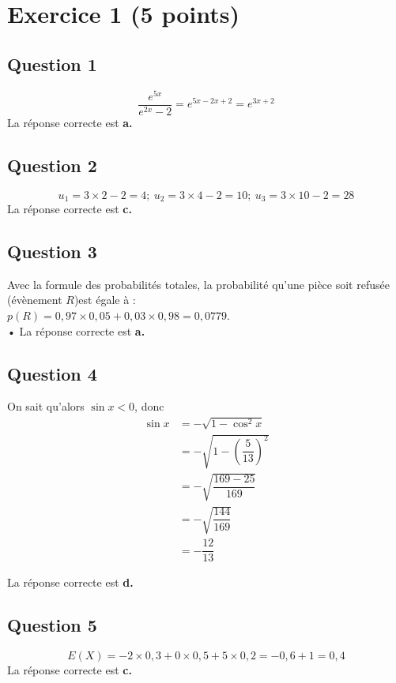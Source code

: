 \section*{Exercice 1 (5 points)}
	

	\subsection*{Question 1}

	
	\[
	\dfrac{e^{5x}}{e^{2x}-2} = e^{5x-2x+2} = e^{3x+2}
	\]
La réponse correcte est \textbf{a.}
	
	\subsection*{Question 2}
	

	
	\[
	u_1 = 3 \times 2 - 2 = 4 ; \ u_2 = 3 \times 4 - 2 = 10 ; \ u_3 = 3 \times 10 - 2 = 28
	\]
La réponse correcte est \textbf{c.}
	
	\subsection*{Question 3}
	
Avec la formule des probabilités totales, la probabilité qu’une pièce soit refusée (évènement $R$)est égale à :\\
 $p(R)=0,97 \times 0,05 + 0,03 \times 0,98 = 0,0779$.\\•
 La réponse correcte est \textbf{a.}
	
	\subsection*{Question 4}
	
On sait qu’alors $\sin x < 0$, donc 
\begin{align*}
	\sin x &= -\sqrt{1 - \cos^2 x}\\
	& = -\sqrt{1 - \left(\dfrac{5}{13}\right)^2}\\
	& = -\sqrt{\dfrac{169 - 25}{169}}\\
	& = -\sqrt{\dfrac{144}{169}}\\
	& = -\dfrac{12}{13}
\end{align*}
	
	La réponse correcte est \textbf{d.}
	
	\subsection*{Question 5}
	
\[
	E(X) = -2 \times 0,3 + 0 \times 0,5 + 5 \times 0,2 = -0,6 + 1 = 0,4
	\]
La réponse correcte est \textbf{c.}
